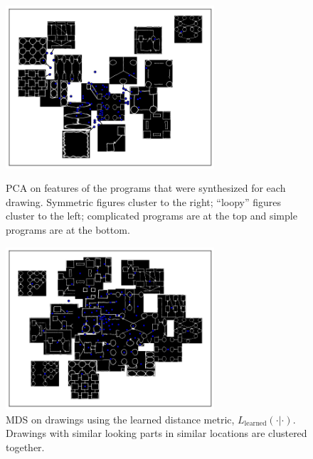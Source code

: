 \documentclass{article}
\begin{document}
\begin{figure}[h]
\centering  \begin{minipage}{\textwidth}\centering
  \includegraphics[width = 0.69\textwidth]{figures/PCA_improved.png}
    \caption{PCA on features of the programs that were synthesized for each drawing. Symmetric figures cluster to the right; ``loopy'' figures cluster to the left; complicated programs are at the top and simple programs are at the bottom.}    \label{NMF}
  \end{minipage} %
  \begin{minipage}{\textwidth}\centering
    \includegraphics[width = 0.69\textwidth]{figures/imageSimilarity.png} 
    \caption{MDS on drawings using the learned distance metric, $L_{\text{learned}}(\cdot|\cdot)$. Drawings with similar looking parts in similar locations are clustered together.}
  \end{minipage}
\end{figure}
\end{document}
